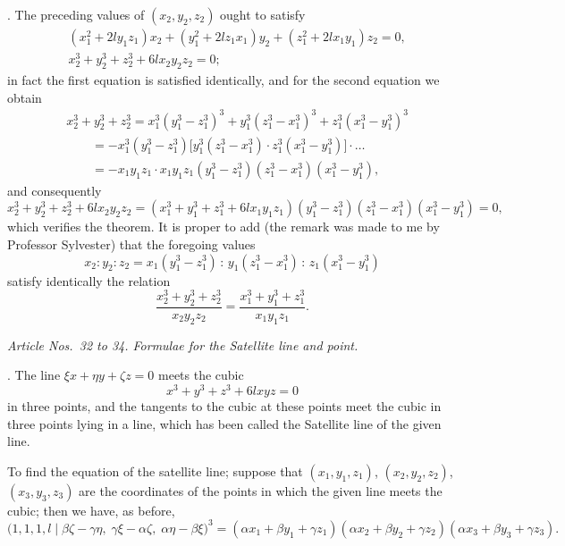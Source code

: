 \documentclass[11pt]{article}
\begin{document}
\medskip

. The preceding values of $(x_2, y_2, z_2)$ ought to satisfy
\begin{align*}
&(x_1^2 + 2 l y_1 z_1) x_2 + (y_1^2 + 2 l z_1 x_1) y_2 + (z_1^2 + 2 l x_1 y_1) z_2 = 0, \\
&x_2^3 + y_2^3 + z_2^3 + 6 l x_2 y_2 z_2 = 0;
\end{align*}
in fact the first equation is satisfied identically, and for the second equation we obtain
\begin{align*}
&x_2^3 + y_2^3 + z_2^3 = x_1^3 (y_1^3 - z_1^3)^3 + y_1^3 (z_1^3 - x_1^3)^3 + z_1^3 (x_1^3 - y_1^3)^3 \\
&\qquad = -x_1^3 (y_1^3 - z_1^3)\bigl[ y_1^3 (z_1^3 - x_1^3) \cdot z_1^3 (x_1^3 - y_1^3) \bigr] \cdot \ldots \\
&\qquad = -x_1 y_1 z_1 \cdot x_1 y_1 z_1 (y_1^3 - z_1^3)(z_1^3 - x_1^3)(x_1^3 - y_1^3),
\end{align*}
and consequently
\[
x_2^3 + y_2^3 + z_2^3 + 6 l x_2 y_2 z_2 = (x_1^3 + y_1^3 + z_1^3 + 6 l x_1 y_1 z_1)(y_1^3 - z_1^3)(z_1^3 - x_1^3)(x_1^3 - y_1^3) = 0,
\]
which verifies the theorem. It is proper to add (the remark was made to me by Professor Sylvester) that the foregoing values
\[
x_2 : y_2 : z_2 = x_1 (y_1^3 - z_1^3) \,:\, y_1 (z_1^3 - x_1^3) \,:\, z_1 (x_1^3 - y_1^3)
\]
satisfy identically the relation
\[
\frac{x_2^3 + y_2^3 + z_2^3}{x_2 y_2 z_2} = \frac{x_1^3 + y_1^3 + z_1^3}{x_1 y_1 z_1}.
\]

\medskip

\textit{Article Nos.~32 to 34. Formulae for the Satellite line and point.}

\medskip

. The line $\xi x + \eta y + \zeta z = 0$ meets the cubic
\[
x^3 + y^3 + z^3 + 6 l x y z = 0
\]
in three points, and the tangents to the cubic at these points meet the cubic in three points lying in a line, which has been called the Satellite line of the given line.

To find the equation of the satellite line; suppose that $(x_1, y_1, z_1)$, $(x_2, y_2, z_2)$, $(x_3, y_3, z_3)$ are the coordinates of the points in which the given line meets the cubic; then we have, as before,
\[
\bigl(1, 1, 1, l \mid \beta\zeta - \gamma\eta,\; \gamma\xi - \alpha\zeta,\; \alpha\eta - \beta\xi\bigr)^3 = (\alpha x_1 + \beta y_1 + \gamma z_1)(\alpha x_2 + \beta y_2 + \gamma z_2)(\alpha x_3 + \beta y_3 + \gamma z_3).
\]
\end{document}
